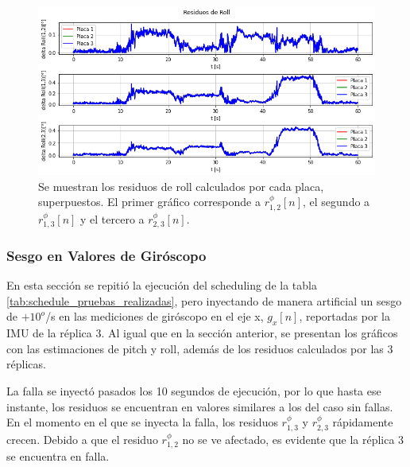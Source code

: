 \begin{figure}[H]
    \centering
    \includegraphics[width=\textwidth]{img/resultados_residuos_roll_sin_fallas.png}
    \caption{Se muestran los residuos de roll calculados por cada placa, superpuestos. El primer gráfico corresponde a $r_{1,2}^{\phi}[n]$, el segundo a $r_{1,3}^{\phi}[n]$ y el tercero a $r_{2,3}^{\phi}[n]$.}
    \label{fig:resultados_residuos_roll_sin_fallas}
\end{figure}

\subsubsection{Sesgo en Valores de Giróscopo}

En esta sección se repitió la ejecución del scheduling de la tabla \ref{tab:schedule_pruebas_realizadas}, pero inyectando de manera artificial un sesgo de $+10 ^{o}$/s en las mediciones de giróscopo en el eje x, $g_x[n]$, reportadas por la IMU de la réplica 3. Al igual que en la sección anterior, se presentan los gráficos con las estimaciones de pitch y roll, además de los residuos calculados por las 3 réplicas.

La falla se inyectó pasados los 10 segundos de ejecución, por lo que hasta ese instante, los residuos se encuentran en valores similares a los del caso sin fallas. En el momento en el que se inyecta la falla, los residuos $r_{1,3}^{\phi}$ y $r_{2,3}^{\phi}$ rápidamente crecen. Debido a que el residuo $r_{1,2}^{\phi}$ no se ve afectado, es evidente que la réplica 3 se encuentra en falla.

